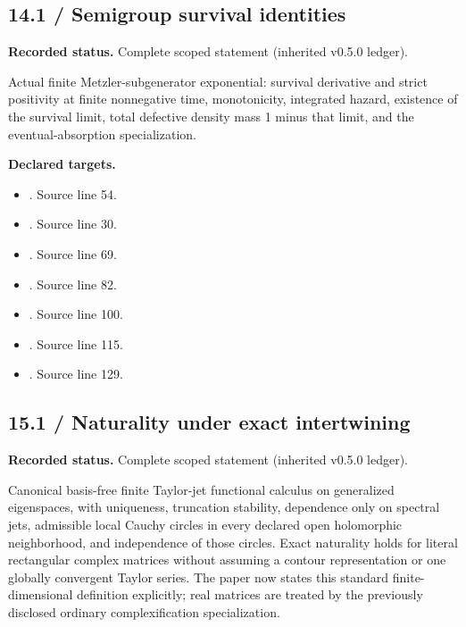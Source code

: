 \subsection{14.1 / Semigroup survival identities}
\label{result:14.1}
\textbf{Recorded status.} Complete scoped statement (inherited v0.5.0 ledger).\par
Actual finite Metzler-subgenerator exponential: survival derivative and strict positivity at finite nonnegative time, monotonicity, integrated hazard, existence of the survival limit, total defective density mass 1 minus that limit, and the eventual-absorption specialization.

\textbf{Declared targets.}\begin{itemize}
\item {}. Source line 54.
\item {}. Source line 30.
\item {}. Source line 69.
\item {}. Source line 82.
\item {}. Source line 100.
\item {}. Source line 115.
\item {}. Source line 129.
\end{itemize}
\subsection{15.1 / Naturality under exact intertwining}
\label{result:15.1}
\textbf{Recorded status.} Complete scoped statement (inherited v0.5.0 ledger).\par
Canonical basis-free finite Taylor-jet functional calculus on generalized eigenspaces, with uniqueness, truncation stability, dependence only on spectral jets, admissible local Cauchy circles in every declared open holomorphic neighborhood, and independence of those circles. Exact naturality holds for literal rectangular complex matrices without assuming a contour representation or one globally convergent Taylor series. The paper now states this standard finite-dimensional definition explicitly; real matrices are treated by the previously disclosed ordinary complexification specialization.

